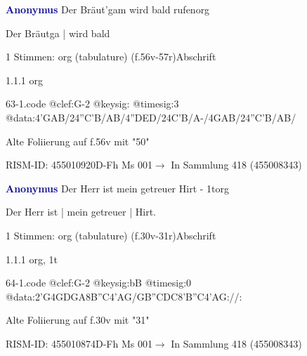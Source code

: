 \documentclass[twocolumn]{book}
\begin{document}
\par \vspace{7pt} \textcolor{darkblue}{\textbf{Anonymus  }}\hfillplus{\textbf{[63]}}\newline Der Bräut'gam wird bald rufen\newline org
\par \begin{itshape}[f.56v, at left:] Der Bräutga | wird bald\end{itshape} 
\par \textcolor{darkblue}{}  1 Stimmen: org (tabulature)  (f.56v-57r)\newline Abschrift
\par 1.1.1  org  
\begin{filecontents*}{63-1.code}
@clef:G-2
@keysig:
@timesig:3
@data:4'GAB/24''C'B/AB/4''DED/24C'B/A-/4GAB/24''C'B/AB/
\end{filecontents*}
\newline
%
\par Alte Foliierung auf f.56v mit "50"
\par RISM-ID: 455010920\newline D-Fh  Ms 001\newline $\rightarrow$ In Sammlung 418 (455008343)
      
\par \vspace{7pt} \textcolor{darkblue}{\textbf{Anonymus  }}\hfillplus{\textbf{[64]}}\newline Der Herr ist mein getreuer Hirt - 1t\newline org
\par \begin{itshape}[f.30v, at left:] Der Herr ist | mein getreuer | Hirt.\end{itshape} 
\par \textcolor{darkblue}{}  1 Stimmen: org (tabulature)  (f.30v-31r)\newline Abschrift
\par 1.1.1  org, 1t  
\begin{filecontents*}{64-1.code}
@clef:G-2
@keysig:bB
@timesig:0
@data:2'G4GDGA{8B''C}4'AG/GB''CDC{8'B''C}4'AG://:
\end{filecontents*}
\newline
%
\par Alte Foliierung auf f.30v mit "31"
\par RISM-ID: 455010874\newline D-Fh  Ms 001\newline $\rightarrow$ In Sammlung 418 (455008343)
      
\end{document}
